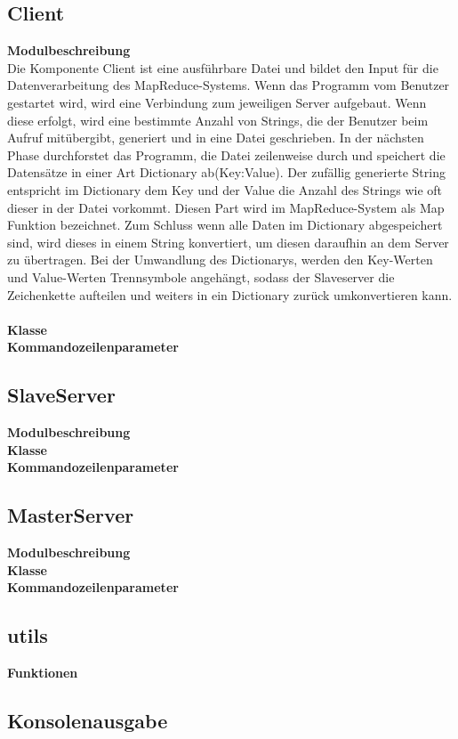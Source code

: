 \documentclass[a4paper,12pt]{article}
\begin{document}
\subsection{Client}
\textbf{Modulbeschreibung}\\
Die Komponente Client ist eine ausführbare Datei und bildet den Input für die Datenverarbeitung des MapReduce-Systems. Wenn das Programm vom Benutzer gestartet wird, wird eine Verbindung zum jeweiligen Server aufgebaut. Wenn diese erfolgt, wird eine bestimmte Anzahl von Strings, 
die der Benutzer beim Aufruf mitübergibt, generiert und in eine Datei geschrieben. In der nächsten Phase durchforstet das Programm, die Datei zeilenweise durch und speichert die Datensätze in einer Art Dictionary ab(Key:Value). Der zufällig generierte String entspricht im Dictionary dem Key und der Value die Anzahl des Strings wie oft dieser in der Datei vorkommt.
Diesen Part wird im MapReduce-System als Map Funktion bezeichnet. Zum Schluss wenn alle Daten im Dictionary abgespeichert sind, wird dieses in einem
String konvertiert, um diesen daraufhin an dem Server zu übertragen. Bei der Umwandlung des Dictionarys, werden den Key-Werten und Value-Werten Trennsymbole angehängt, sodass der Slaveserver die Zeichenkette aufteilen und weiters in ein Dictionary zurück umkonvertieren kann.\\\\
\textbf{Klasse}\\
\textbf{Kommandozeilenparameter}\\
\subsection{SlaveServer}
\textbf{Modulbeschreibung}\\
\textbf{Klasse}\\
\textbf{Kommandozeilenparameter}\\
\subsection{MasterServer}
\textbf{Modulbeschreibung}\\
\textbf{Klasse}\\
\textbf{Kommandozeilenparameter}\\ 
\subsection{utils}
\textbf{Funktionen}\\
\subsection{Konsolenausgabe}
\newpage
\noindent
\end{document}
